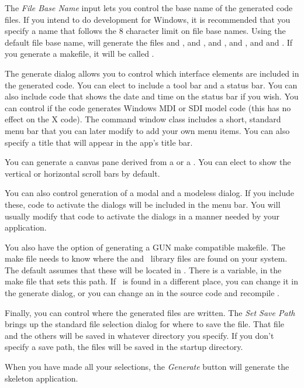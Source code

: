 The \emph{File Base Name} input lets you control
the base name of the generated code files. If you
intend to do development for Windows, it is recommended
that you specify a name that follows the 8 character
limit on file base names. Using the default 
file base name,  will generate the files
 and , 
and ,  and ,
 and , and 
and . If you generate a makefile, it
will be called .

The generate dialog allows you to control which interface
elements are included in the generated code. You can
elect to include a tool bar and a status bar. You can
also include code that shows the date and time on
the status bar if you wish. You can control if the
code generates Windows MDI or SDI model code (this
has no effect on the X code). The command window
class includes a short, standard menu bar that you
can later modify to add your own menu items.
You can also specify a title that will appear in
the app's title bar.

You can generate a canvas pane derived
from a  or a .
You can elect to show the vertical or horizontal
scroll bars by default.

You can also control generation of a modal and a modeless
dialog. If you include these, code to activate the dialogs
will be included in the menu bar. You will usually modify
that code to activate the dialogs in a manner needed by
your application. 

You also have the option of generating
a GUN make compatible makefile. The make file needs to
know where the  and \V\ library files
are found on your system. The default 
assumes that these will be located in .
There is a variable,  in the make file that
sets this path. If \V\ is found in a different place, you
can change it in the generate dialog, or you can change
an  in the source code and recompile .

Finally, you can control where the generated files are written.
The \emph{Set Save Path} brings up the standard file selection
dialog for where to save the  file. That file
and the others will be saved in whatever directory you specify.
If you don't specify a save path, the files will be saved in
the startup directory.

When you have made all your selections, the \emph{Generate}
button will generate the skeleton application.

